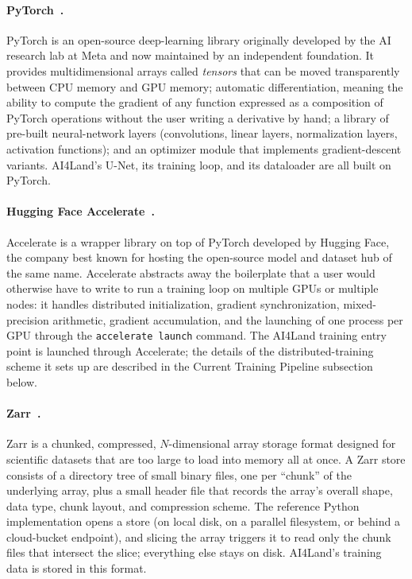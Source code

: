 \documentclass[12pt,a4paper]{article}
\begin{document}
\paragraph{PyTorch~\cite{pytorch}.} PyTorch is an open-source deep-learning library
originally developed by the AI research lab at Meta and now maintained by an
independent foundation. It provides multidimensional arrays called \emph{tensors} that can be
moved transparently between CPU memory and GPU memory; automatic differentiation, meaning the
ability to compute the gradient of any function expressed as a composition of PyTorch
operations without the user writing a derivative by hand; a library of pre-built
neural-network layers (convolutions, linear layers, normalization layers, activation
functions); and an optimizer module that implements gradient-descent variants. AI4Land's
U-Net, its training loop, and its dataloader are all built on PyTorch.

\paragraph{Hugging Face Accelerate~\cite{accelerate}.} Accelerate is a wrapper library on top
of PyTorch developed by Hugging Face, the company best known for hosting the open-source
model and dataset hub of the same name. Accelerate abstracts away the boilerplate that a user
would otherwise have to write to run a training loop on multiple GPUs or multiple nodes: it
handles distributed initialization, gradient synchronization, mixed-precision arithmetic,
gradient accumulation, and the launching of one process per GPU through the
\texttt{accelerate launch} command. The AI4Land training entry point is launched through
Accelerate; the details of the distributed-training scheme it sets up are described in
the Current Training Pipeline subsection below.

\paragraph{Zarr~\cite{newman2024zarr,zarr_software}.} Zarr is a chunked, compressed,
$N$-dimensional array storage format designed for scientific datasets that are too large
to load into memory all at once. A Zarr store consists of a directory tree of small
binary files, one per ``chunk'' of the underlying array, plus a small header file that
records the array's overall shape, data type, chunk layout, and compression scheme. The
reference Python implementation opens a store (on local disk, on a parallel filesystem,
or behind a cloud-bucket endpoint), and slicing the array triggers it to read only the
chunk files that intersect the slice; everything else stays on disk. AI4Land's training
data is stored in this format.
\end{document}
